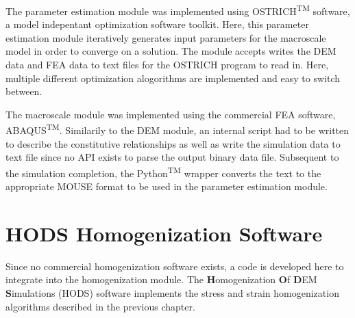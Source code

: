 The parameter estimation module was implemented using OSTRICH\textsuperscript{TM} software, a model indepentant optimization software toolkit. Here, this parameter estimation module iteratively generates input parameters for the macroscale model in order to converge on a solution. The module accepts writes the DEM data and FEA data to text files for the OSTRICH program to read in. Here, multiple different optimization alogorithms are implemented and easy to switch between.

The macroscale module was implemented using the commercial FEA software, ABAQUS\textsuperscript{TM}. Similarily to the DEM module, an internal script had to be written to describe the constitutive relationships as well as write the simulation data to text file since no API exists to parse the output binary data file. Subsequent to the simulation completion, the Python\textsuperscript{TM} wrapper converts the text to the appropriate MOUSE format to be used in the parameter estimation module.


\section{HODS Homogenization Software}

Since no commercial homogenization software exists, a code is developed here to integrate into the homogenization module. The \textbf{H}omogenization \textbf{O}f \textbf{D}EM \textbf{S}imulations (HODS) software implements the stress and strain homogenization algorithms described in the previous chapter. 

